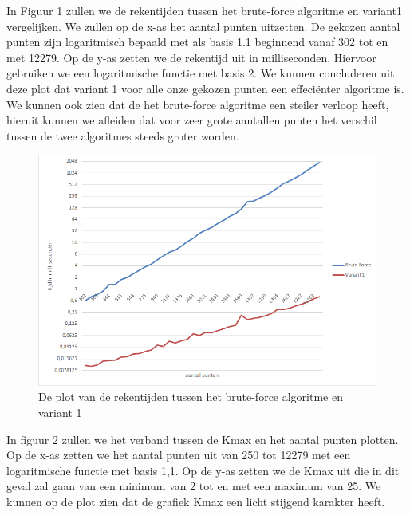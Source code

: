 \documentclass[12pt]{article}
\begin{document}
In Figuur 1 zullen we de rekentijden tussen het brute-force algoritme en variant1 vergelijken.
We zullen op de x-as het aantal punten uitzetten.
De gekozen aantal punten zijn logaritmisch bepaald met als basis 1.1 beginnend vanaf 302 tot en met 12279.
Op de y-as zetten we de rekentijd uit in milliseconden. Hiervoor gebruiken we een logaritmische functie met basis 2.
We kunnen concluderen uit deze plot dat variant 1 voor alle onze gekozen punten een effeciënter algoritme is.
We kunnen ook zien dat de het brute-force algoritme een steiler verloop heeft, hieruit kunnen we afleiden dat voor zeer grote aantallen punten het verschil tussen de twee algoritmes steeds groter worden.

\begin{figure}
\includegraphics[width=\textwidth]{Simpel-var1-rekentijd.png}
\caption{De plot van de rekentijden tussen het brute-force algoritme en variant 1}
\end{figure}

In figuur 2 zullen we het verband tussen de Kmax en het aantal punten plotten.
Op de x-as zetten we het aantal punten uit van 250 tot 12279 met een logaritmische functie met basis 1,1.
Op de y-as zetten we de Kmax uit die in dit geval zal gaan van een minimum van 2 tot en met een maximum van 25.
We kunnen op de plot zien dat de grafiek Kmax een licht stijgend karakter heeft.
\end{document}
